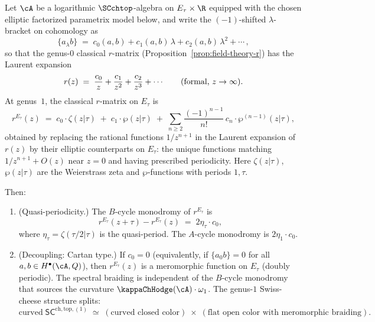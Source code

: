 \begin{theorem}
\label{thm:elliptic-spectral-dichotomy}
Let $\cA$ be a logarithmic $\SCchtop$-algebra on $E_\tau \times \R$
equipped with the chosen elliptic factorized parametrix model below,
and write the
$(-1)$-shifted $\lambda$-bracket on cohomology as
\[
\{a {}_\lambda b\}
\;=\;
c_0(a,b) + c_1(a,b)\,\lambda + c_2(a,b)\,\lambda^2 + \cdots\,,
\]
so that the genus-$0$ classical $r$-matrix
\textup{(}Proposition~\textup{\ref{prop:field-theory-r})} has the
Laurent expansion
\[
r(z)
\;=\;
\frac{c_0}{z} + \frac{c_1}{z^2} + \frac{c_2}{z^3} + \cdots
\qquad \text{\textup{(}formal, $z \to \infty$\textup{)}}.
\]
At genus~$1$, the classical $r$-matrix on $E_\tau$ is
\begin{equation}
\label{eq:elliptic-r-matrix}
r^{E_\tau}(z)
\;=\;
c_0 \cdot \zeta(z|\tau)
\;+\;
c_1 \cdot \wp(z|\tau)
\;+\;
\sum_{n \ge 2}
 \frac{(-1)^{n-1}}{n!}\,
 c_n \cdot \wp^{(n-1)}(z|\tau),
\end{equation}
obtained by replacing the rational functions $1/z^{n+1}$ in the
Laurent expansion of $r(z)$ by their elliptic counterparts on
$E_\tau$: the unique functions matching $1/z^{n+1} + O(z)$
near $z = 0$ and having prescribed periodicity. Here
$\zeta(z|\tau)$, $\wp(z|\tau)$ are the Weierstrass zeta and
$\wp$-functions with periods $1, \tau$.

Then:
\begin{enumerate}[label=\textup{(\alph*)}]
\item \label{item:dichotomy-monodromy}
\textup{(Quasi-periodicity.)}
The $B$-cycle monodromy of $r^{E_\tau}$ is
\begin{equation}
\label{eq:r-monodromy}
r^{E_\tau}(z + \tau) - r^{E_\tau}(z)
\;=\;
2\eta_\tau \cdot c_0,
\end{equation}
where $\eta_\tau = \zeta(\tau/2|\tau)$ is the quasi-period. The
$A$-cycle monodromy is $2\eta_1 \cdot c_0$.

\item \label{item:dichotomy-decoupling}
\textup{(Decoupling: Cartan type.)}
If $c_0 = 0$ (equivalently, if
$\{a {}_0 b\} = 0$ for all
$a, b \in H^\bullet(\cA, Q)$), then $r^{E_\tau}(z)$ is a
meromorphic function on $E_\tau$ \textup{(}doubly
periodic\textup{)}.
The spectral braiding is independent of the $B$-cycle monodromy
that sources the curvature $\kappaChHodge(\cA) \cdot \omega_1$. The
genus-$1$ Swiss-cheese structure splits:
\[
\text{curved}\;\mathsf{SC}^{\mathrm{ch,top},(1)}
\;\simeq\;
(\text{curved closed color})
\;\times\;
(\text{flat open color with meromorphic braiding}).
\]


\end{enumerate}
\end{theorem}

